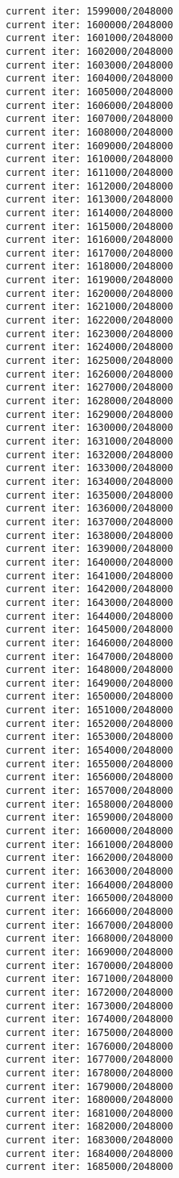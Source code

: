 \documentclass[11pt]{article}
\begin{document}
\begin{Verbatim}[commandchars=\\\{\}]
current iter: 1599000/2048000
current iter: 1600000/2048000
current iter: 1601000/2048000
current iter: 1602000/2048000
current iter: 1603000/2048000
current iter: 1604000/2048000
current iter: 1605000/2048000
current iter: 1606000/2048000
current iter: 1607000/2048000
current iter: 1608000/2048000
current iter: 1609000/2048000
current iter: 1610000/2048000
current iter: 1611000/2048000
current iter: 1612000/2048000
current iter: 1613000/2048000
current iter: 1614000/2048000
current iter: 1615000/2048000
current iter: 1616000/2048000
current iter: 1617000/2048000
current iter: 1618000/2048000
current iter: 1619000/2048000
current iter: 1620000/2048000
current iter: 1621000/2048000
current iter: 1622000/2048000
current iter: 1623000/2048000
current iter: 1624000/2048000
current iter: 1625000/2048000
current iter: 1626000/2048000
current iter: 1627000/2048000
current iter: 1628000/2048000
current iter: 1629000/2048000
current iter: 1630000/2048000
current iter: 1631000/2048000
current iter: 1632000/2048000
current iter: 1633000/2048000
current iter: 1634000/2048000
current iter: 1635000/2048000
current iter: 1636000/2048000
current iter: 1637000/2048000
current iter: 1638000/2048000
current iter: 1639000/2048000
current iter: 1640000/2048000
current iter: 1641000/2048000
current iter: 1642000/2048000
current iter: 1643000/2048000
current iter: 1644000/2048000
current iter: 1645000/2048000
current iter: 1646000/2048000
current iter: 1647000/2048000
current iter: 1648000/2048000
current iter: 1649000/2048000
current iter: 1650000/2048000
current iter: 1651000/2048000
current iter: 1652000/2048000
current iter: 1653000/2048000
current iter: 1654000/2048000
current iter: 1655000/2048000
current iter: 1656000/2048000
current iter: 1657000/2048000
current iter: 1658000/2048000
current iter: 1659000/2048000
current iter: 1660000/2048000
current iter: 1661000/2048000
current iter: 1662000/2048000
current iter: 1663000/2048000
current iter: 1664000/2048000
current iter: 1665000/2048000
current iter: 1666000/2048000
current iter: 1667000/2048000
current iter: 1668000/2048000
current iter: 1669000/2048000
current iter: 1670000/2048000
current iter: 1671000/2048000
current iter: 1672000/2048000
current iter: 1673000/2048000
current iter: 1674000/2048000
current iter: 1675000/2048000
current iter: 1676000/2048000
current iter: 1677000/2048000
current iter: 1678000/2048000
current iter: 1679000/2048000
current iter: 1680000/2048000
current iter: 1681000/2048000
current iter: 1682000/2048000
current iter: 1683000/2048000
current iter: 1684000/2048000
current iter: 1685000/2048000

\end{Verbatim}
\end{document}
